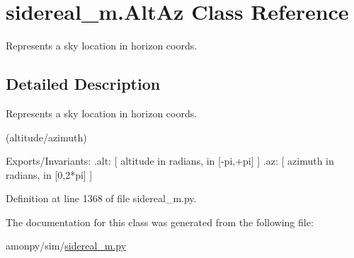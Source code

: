 \hypertarget{classsidereal__m_1_1_alt_az}{\section{sidereal\-\_\-m.\-Alt\-Az Class Reference}
\label{classsidereal__m_1_1_alt_az}
}


Represents a sky location in horizon coords.  




\subsection{Detailed Description}
Represents a sky location in horizon coords. 

(altitude/azimuth) \begin{DoxyVerb}  Exports/Invariants:
    .alt:   [ altitude in radians, in [-pi,+pi] ]
    .az:    [ azimuth in radians, in [0,2*pi] ]\end{DoxyVerb}
 

Definition at line 1368 of file sidereal\-\_\-m.\-py.



The documentation for this class was generated from the following file\-:\begin{DoxyCompactItemize}
\item 
amonpy/sim/\hyperlink{sidereal__m_8py}{sidereal\-\_\-m.\-py}\end{DoxyCompactItemize}
